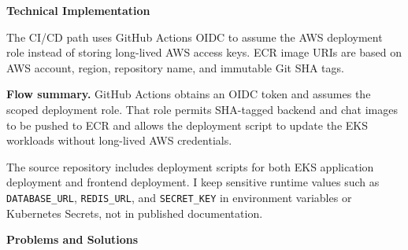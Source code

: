 \vspace{0.5em}\noindent\textbf{Technical Implementation}\par

The CI/CD path uses GitHub Actions OIDC to assume the AWS deployment
role instead of storing long-lived AWS access keys. ECR image URIs are
based on AWS account, region, repository name, and immutable Git SHA
tags.

\textbf{Flow summary.} GitHub Actions obtains an OIDC token and assumes
the scoped deployment role. That role permits SHA-tagged backend and
chat images to be pushed to ECR and allows the deployment script to
update the EKS workloads without long-lived AWS credentials.

The source repository includes deployment scripts for both EKS
application deployment and frontend deployment. I keep sensitive runtime
values such as \texttt{DATABASE\_\allowbreak{}URL}, \texttt{REDIS\_\allowbreak{}URL}, and
\texttt{SECRET\_\allowbreak{}KEY} in environment variables or Kubernetes Secrets, not
in published documentation.

\vspace{0.5em}\noindent\textbf{Problems and Solutions}\par

